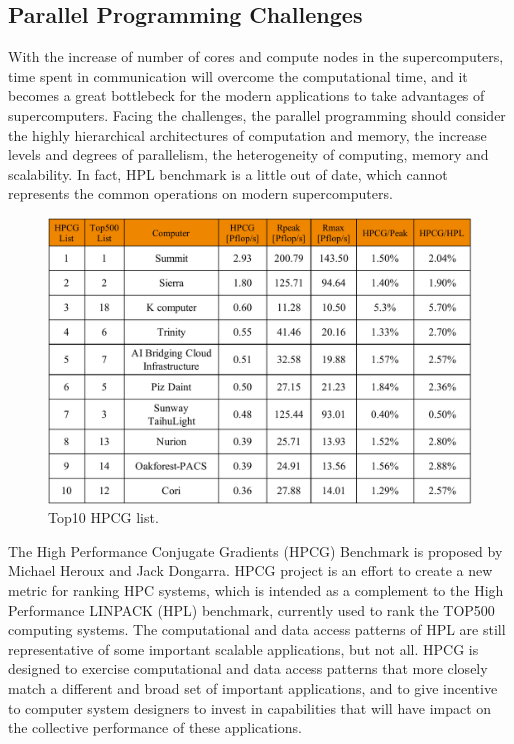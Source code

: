 \subsection{Parallel Programming Challenges} \label{Parallel Programming Challenges}

With the increase of number of cores and compute nodes in the supercomputers, time spent in communication will overcome the computational time, and it becomes a great bottlebeck for the modern applications to take advantages of supercomputers. Facing the challenges, the parallel programming should consider the highly hierarchical architectures of computation and memory, the increase levels and degrees of parallelism, the heterogeneity of computing, memory and scalability. In fact, HPL benchmark is a little out of date, which cannot represents the common operations on modern supercomputers.

\begin{figure}[htbp]
	\centering
	\includegraphics[width=6.2in]{fig/top500_hpcg.pdf}
	\caption{Top10 HPCG list.}
	\label{top500-hpxg}
\end{figure}

The High Performance Conjugate Gradients (HPCG) Benchmark \cite{dongarra2015hpcg} is proposed by Michael Heroux and Jack Dongarra. HPCG project is an effort to create a new metric for ranking HPC systems, which is intended as a complement to the High Performance LINPACK (HPL) benchmark, currently used to rank the TOP500 computing systems. The computational and data access patterns of HPL are still representative of some important scalable applications, but not all. HPCG is designed to exercise computational and data access patterns that more closely match a different and broad set of important applications, and to give incentive to computer system designers to invest in capabilities that will have impact on the collective performance of these applications.

